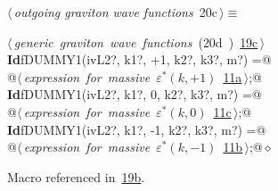 \documentclass[a4paper,12pt]{amsart}
\renewcommand{\NWtarget}[2]{\hypertarget{#1}{#2}}
\renewcommand{\NWlink}[2]{\hyperlink{#1}{#2}}
\renewcommand{\NWtxtMacroRefIn}{Macro referenced in}
\renewcommand{\NWsep}{${\diamond}$}
\begin{document}
\begin{flushleft} \small
\begin{minipage}{\linewidth}\label{scrap44}\raggedright\small
\NWtarget{nuweb20c}{} $\langle\,${\itshape outgoing graviton wave functions}\nobreak\ {\footnotesize {20c}}$\,\rangle\equiv$
\vspace{-1ex}
\begin{list}{}{} \item
\mbox{}\verb@@\hbox{$\langle\,${\itshape generic graviton wave functions}\nobreak\ ({\footnotesize 20d\label{scrap45}
 }\mbox{}\verb@out@ ) {\footnotesize \NWlink{nuweb19c}{19c}}$\,\rangle$}\verb@@\\
\mbox{}\verb@@\hbox{\sffamily\bfseries Id}\verb@ fDUMMY1(ivL2?, k1?, +1, k2?, k3?, m?) =@\\
\mbox{}\verb@   @\hbox{$\langle\,${\itshape expression for massive $\varepsilon^\ast(k, +1)$}\nobreak\ {\footnotesize \NWlink{nuweb11a}{11a}}$\,\rangle$}\verb@;@\\
\mbox{}\verb@@\hbox{\sffamily\bfseries Id}\verb@ fDUMMY1(ivL2?, k1?, 0, k2?, k3?, m?) =@\\
\mbox{}\verb@   @\hbox{$\langle\,${\itshape expression for massive $\varepsilon^\ast(k, 0)$}\nobreak\ {\footnotesize \NWlink{nuweb11c}{11c}}$\,\rangle$}\verb@;@\\
\mbox{}\verb@@\hbox{\sffamily\bfseries Id}\verb@ fDUMMY1(ivL2?, k1?, -1, k2?, k3?, m?) =@\\
\mbox{}\verb@   @\hbox{$\langle\,${\itshape expression for massive $\varepsilon^\ast(k, -1)$}\nobreak\ {\footnotesize \NWlink{nuweb11b}{11b}}$\,\rangle$}\verb@;@{\NWsep}
\end{list}
\vspace{-1.5ex}
\footnotesize
\begin{list}{}{\setlength{\itemsep}{-\parsep}\setlength{\itemindent}{-\leftmargin}}
\item \NWtxtMacroRefIn\ \NWlink{nuweb19b}{19b}.

\item{}
\end{list}
\end{minipage}\vspace{4ex}
\end{flushleft}
\end{document}
